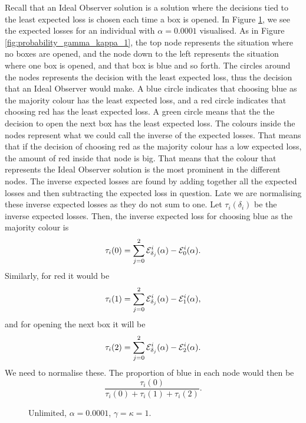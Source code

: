 Recall that an Ideal Observer solution is a solution where the decisions tied to the least expected loss is chosen each time a box is opened. In Figure \ref{fig:unlim_a0.0001_gk1}, we see the expected losses for an individual with $\alpha=0.0001$ visualised. As in Figure \ref{fig:probability_gamma_kappa_1}, the top node represents the situation where no boxes are opened, and the node down to the left represents the situation where one box is opened, and that box is blue and so forth. The circles around the nodes represents the decision with the least expected loss, thus the decision that an Ideal Observer would make. A blue circle indicates that choosing blue as the majority colour has the least expected loss, and a red circle indicates that choosing red has the least expected loss. A green circle means that the the decision to open the next box has the least expected loss. The colours inside the nodes represent what we could call the inverse of the expected losses. That means that if the decision of choosing red as the majority colour has a low expected loss, the amount of red inside that node is big. That means that the colour that represents the Ideal Observer solution is the most prominent in the different nodes. The inverse expected losses are found by adding together all the expected losses and then subtracting the expected loss in question. Late we are normalising these inverse expected losses as they do not sum to one. Let $\tau_i(\delta_i)$ be the inverse expected losses. Then, the inverse expected loss for choosing blue as the majority colour is 
\begin{equation*}
    \tau_i(0) = \sum_{j=0}^2 \mathcal{E}_{\delta_j}^i(\alpha) - \mathcal{E}_0^i(\alpha).
\end{equation*}
Similarly, for red it would be
\begin{equation*}
    \tau_i(1) = \sum_{j=0}^2 \mathcal{E}_{\delta_j}^i(\alpha) - \mathcal{E}_1^i(\alpha),
\end{equation*}
and for opening the next box it will be
\begin{equation*}
    \tau_i(2) = \sum_{j=0}^2 \mathcal{E}_{\delta_j}^i(\alpha) - \mathcal{E}_2^i(\alpha).
\end{equation*}
We need to normalise these. The proportion of blue in each node would then be
\begin{equation*}
    \frac{\tau_i(0)}{\tau_i(0)+\tau_i(1)+\tau_i(2)}.
\end{equation*}
\begin{figure}
    \centering
    \scalebox{0.7}{}
    \caption[IO solution, unlimited. $\alpha=0.0001$, $\gamma=\kappa=1$]{Unlimited, $\alpha = 0.0001$, $\gamma=\kappa=1$.}
    \label{fig:unlim_a0.0001_gk1}
\end{figure}


